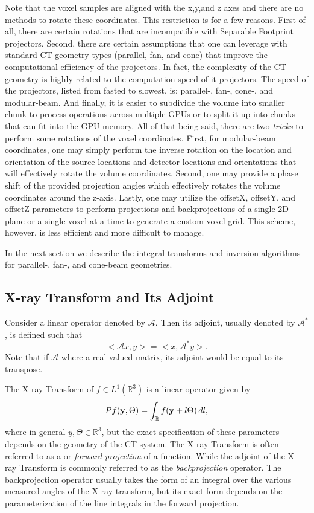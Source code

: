\documentclass[11pt]{article}
\begin{document}
Note that the voxel samples are aligned with the x,y,and z axes and there are no methods to rotate these coordinates.  This restriction is for a few reasons.  First of all, there are certain rotations that are incompatible with Separable Footprint projectors.  Second, there are certain assumptions that one can leverage with standard CT geometry types (parallel, fan, and cone) that improve the computational efficiency of the projectors.  In fact, the complexity of the CT geometry is highly related to the computation speed of it projectors.  The speed of the projectors, listed from fasted to slowest, is: parallel-, fan-, cone-, and modular-beam.  And finally, it is easier to subdivide the volume into smaller chunk to process operations across multiple GPUs or to split it up into chunks that can fit into the GPU memory.  All of that being said, there are two \textit{tricks} to perform some rotations of the voxel coordinates.  First, for modular-beam coordinates, one may simply perform the inverse rotation on the location and orientation of the source locations and detector locations and orientations that will effectively rotate the volume coordinates.  Second, one may provide a phase shift of the provided projection angles which effectively rotates the volume coordinates around the z-axis.  Lastly, one may utilize the offsetX, offsetY, and offsetZ parameters to perform projections and backprojections of a single 2D plane or a single voxel at a time to generate a custom voxel grid.  This scheme, however, is less efficient and more difficult to manage.

In the next section we describe the integral transforms and inversion algorithms for parallel-, fan-, and cone-beam geometries.

\subsection{X-ray Transform and Its Adjoint}

Consider a linear operator denoted by $\mathcal{A}$.  Then its adjoint, usually denoted by $\mathcal{A}^*$, is defined such that $$<\mathcal{A}x, y> = <x, \mathcal{A}^*y>.$$  Note that if $\mathcal{A}$ where a real-valued matrix, its adjoint would be equal to its transpose.

The X-ray Transform of $f \in L^1(\mathbb{R}^3)$ is a linear operator given by
\begin{eqnarray*}
    Pf(\textbf{y}, \Theta) = \int_\mathbb{R} f(\textbf{y} + l\Theta) \, dl,
\end{eqnarray*}
where in general $y, \Theta \in \mathbb{R}^3$, but the exact specification of these parameters depends on the geometry of the CT system.  The X-ray Transform is often referred to as a  or \textit{forward projection} of a function.  While the adjoint of the X-ray Transform is commonly referred to as the \textit{backprojection} operator.  The backprojection operator usually takes the form of an integral over the various measured angles of the X-ray transform, but its exact form depends on the parameterization of the line integrals in the forward projection.
\end{document}
